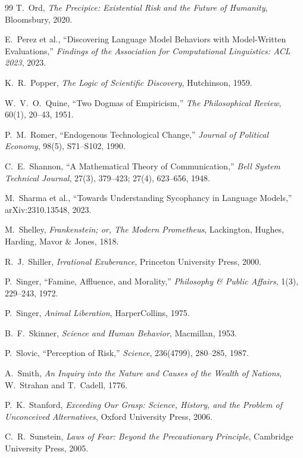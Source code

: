 \begin{thebibliography}{99}
T.~Ord, \textit{The Precipice: Existential Risk and the Future of Humanity}, Bloomsbury, 2020.

E.~Perez et al., ``Discovering Language Model Behaviors with Model-Written Evaluations,'' \textit{Findings of the Association for Computational Linguistics: ACL 2023}, 2023.

K.~R.~Popper, \textit{The Logic of Scientific Discovery}, Hutchinson, 1959.

W.~V.~O.~Quine, ``Two Dogmas of Empiricism,'' \textit{The Philosophical Review}, 60(1), 20--43, 1951.

P.~M.~Romer, ``Endogenous Technological Change,'' \textit{Journal of Political Economy}, 98(5), S71--S102, 1990.

C.~E.~Shannon, ``A Mathematical Theory of Communication,'' \textit{Bell System Technical Journal}, 27(3), 379--423; 27(4), 623--656, 1948.

M.~Sharma et al., ``Towards Understanding Sycophancy in Language Models,'' arXiv:2310.13548, 2023.

M.~Shelley, \textit{Frankenstein; or, The Modern Prometheus}, Lackington, Hughes, Harding, Mavor \& Jones, 1818.

R.~J.~Shiller, \textit{Irrational Exuberance}, Princeton University Press, 2000.

P.~Singer, ``Famine, Affluence, and Morality,'' \textit{Philosophy \& Public Affairs}, 1(3), 229--243, 1972.

P.~Singer, \textit{Animal Liberation}, HarperCollins, 1975.

B.~F.~Skinner, \textit{Science and Human Behavior}, Macmillan, 1953.

P.~Slovic, ``Perception of Risk,'' \textit{Science}, 236(4799), 280--285, 1987.

A.~Smith, \textit{An Inquiry into the Nature and Causes of the Wealth of Nations}, W.~Strahan and T.~Cadell, 1776.

P.~K.~Stanford, \textit{Exceeding Our Grasp: Science, History, and the Problem of Unconceived Alternatives}, Oxford University Press, 2006.

C.~R.~Sunstein, \textit{Laws of Fear: Beyond the Precautionary Principle}, Cambridge University Press, 2005.


\end{thebibliography}
